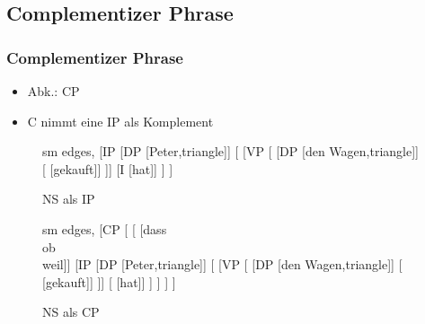 \subsection{Complementizer Phrase}

\begin{frame}
\frametitle{Complementizer Phrase}

\begin{itemize}
	\item Abk.: CP
	\item C nimmt eine IP als Komplement
\end{itemize}

\begin{figure}[b]
	\begin{minipage}[b]{0.45\textwidth}
	\centering
	\tiny{
		\begin{forest}
		sm edges,
		[IP [DP [Peter,triangle]]
			[ [VP 
					[ [DP [den Wagen,triangle]]
						[ [gekauft]]
						]]
				[I [hat]]
				]
		]
		\end{forest}
		}
		\caption{NS als IP}	
  	\end{minipage}  
  	\begin{minipage}[b]{0.05\textwidth}
	\hfill
	\end{minipage}  
	\begin{minipage}[b]{0.45\textwidth}
	\centering
	\tiny{
		\begin{forest}
		sm edges,
[CP	[	[ [\alert{dass}\\ \alert{ob}\\ \alert{weil}]]	
		[IP [DP [Peter,triangle]]
			[\MyPxbar{I} [VP
					[ [DP [den Wagen,triangle]]
						[\zerobar{V} [gekauft]]
						]]
				[\zerobar{I} [hat]]
				]
		]
	]
]
		\end{forest}
		}
		\caption{NS als CP}	
  	\end{minipage}  
\end{figure}

\end{frame}


